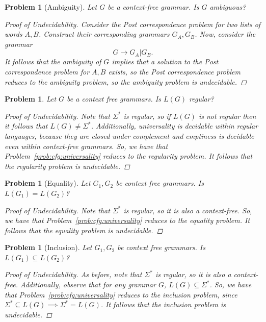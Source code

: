 \documentclass[psamsfonts]{amsart}
\newtheorem{prob}[thm]{Problem}
\theoremstyle{definition}
\theoremstyle{remark}
\numberwithin{equation}{section}
\begin{document}
\begin{prob}[Ambiguity]
  Let $G$ be a context-free grammar. Is $G$ ambiguous?
  \begin{proof}[Proof of Undecidability]
    Consider the Post correspondence problem for two lists of words
    $A,B$. Construct their corresponding grammars $G_A,G_B$. Now, consider the
    grammar
    \[
      G \rightarrow G_A \vert G_B.
    \]
    It follows that the ambiguity of $G$ implies that a solution to the Post
    correspondence problem for $A,B$ exists, so the Post correspondence problem
    reduces to the ambiguity problem, so the ambiguity problem is undecidable.
  \end{proof}
\end{prob}
\cite{greibach66:_unsol_recog_linear_contex_free_languag}
\cite{Hopcroft1969}
\begin{prob}
  Let $G$ be a context free grammars. Is $L(G)$ regular?
  \begin{proof}[Proof of Undecidability]
    Note that $\Sigma^*$ is regular, so if $L(G)$ is not regular then it follows
    that $L(G)\neq \Sigma^*$. Additionally, universality is decidable within
    regular languages, because they are closed under complement and emptiness is
    decidable even within context-free grammars. So, we have that
    Problem~\ref{prob:cfg:universality} reduces to the regularity problem. It
    follows that the regularity problem is undecidable.
  \end{proof}
\end{prob}
\begin{prob}[Equality]
  Let $G_1,G_2$ be context free grammars. Is $L(G_1)=L(G_2)$?
  \begin{proof}[Proof of Undecidability]
    Note that $\Sigma^*$ is regular, so it is also a context-free. So,
    we have that Problem~\ref{prob:cfg:universality} reduces to the equality
    problem. It follows that the equality problem is undecidable.
  \end{proof}
\end{prob}
\begin{prob}[Inclusion]
  Let $G_1,G_2$ be context free grammars. Is $L(G_1)\subseteq L(G_2)$?
  \begin{proof}[Proof of Undecidability]
    As before, note that $\Sigma^*$ is regular, so it is also a
    context-free. Additionally, observe that for any grammar $G$, $L(G)\subseteq
    \Sigma^*$. So,
    we have that Problem~\ref{prob:cfg:universality} reduces to the inclusion
    problem, since $\Sigma^* \subseteq L(G) \implies \Sigma^* = L(G)$. It follows that the inclusion problem is undecidable.
  \end{proof}
\end{prob}
\end{document}
